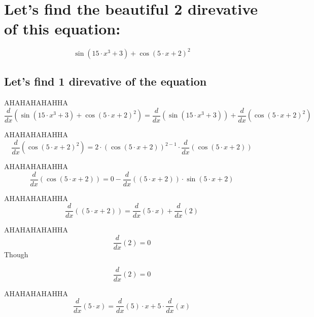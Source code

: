 \documentclass[12pt,a4paper]{extreport}
\begin{document}
\tableofcontents
\newpage

\section{Let's find the beautiful 2 direvative of this equation:}

\begin{dmath*}
    \sin \left(15\cdot x^{3}+3\right)+\cos \left(5\cdot x+2\right)^{2}
\end{dmath*}
\subsection{Let's find  1 direvative of the equation}

AHAHAHAHAHHA
\begin{dmath*}
    \frac{d}{dx}\left(\sin \left(15\cdot x^{3}+3\right)+\cos \left(5\cdot x+2\right)^{2}\right) = \frac{d}{dx}\left(\sin \left(15\cdot x^{3}+3\right)\right) + \frac{d}{dx}\left(\cos \left(5\cdot x+2\right)^{2}\right)
\end{dmath*}

AHAHAHAHAHHA
\begin{dmath*}
    \frac{d}{dx}\left(\cos \left(5\cdot x+2\right)^{2}\right) = 2 \cdot \left(\cos \left(5\cdot x+2\right)\right)^{2 -  1 } \cdot \frac{d}{dx}\left(\cos \left(5\cdot x+2\right)\right)
\end{dmath*}

AHAHAHAHAHHA
\begin{dmath*}
    \frac{d}{dx}\left(\cos \left(5\cdot x+2\right)\right) =  0  - \frac{d}{dx}\left(\left(5\cdot x+2\right)\right) \cdot \sin\left(5\cdot x+2\right)
\end{dmath*}

AHAHAHAHAHHA
\begin{dmath*}
    \frac{d}{dx}\left(\left(5\cdot x+2\right)\right) = \frac{d}{dx}\left(5\cdot x\right) + \frac{d}{dx}\left(2\right)
\end{dmath*}

AHAHAHAHAHHA
\begin{dmath*}
    \frac{d}{dx}\left(2\right) =  0 
\end{dmath*}
Though


\begin{dmath*}
    \frac{d}{dx} \left(2\right) = 0
\end{dmath*}

AHAHAHAHAHHA
\begin{dmath*}
    \frac{d}{dx}\left(5\cdot x\right) = \frac{d}{dx}\left(5\right) \cdot x + 5 \cdot \frac{d}{dx}\left(x\right)
\end{dmath*}
\end{document}
